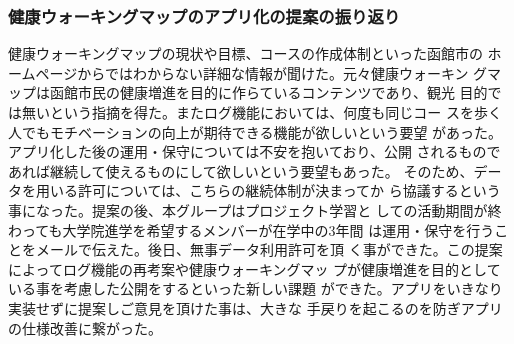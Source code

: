 ﻿\subsubsection{健康ウォーキングマップのアプリ化の提案の振り返り}
健康ウォーキングマップの現状や目標、コースの作成体制といった函館市の
ホームページからではわからない詳細な情報が聞けた。元々健康ウォーキン
グマップは函館市民の健康増進を目的に作らているコンテンツであり、観光
目的では無いという指摘を得た。またログ機能においては、何度も同じコー
スを歩く人でもモチベーションの向上が期待できる機能が欲しいという要望
があった。アプリ化した後の運用・保守については不安を抱いており、公開
されるものであれば継続して使えるものにして欲しいという要望もあった。
そのため、データを用いる許可については、こちらの継続体制が決まってか
ら協議するという事になった。提案の後、本グループはプロジェクト学習と
しての活動期間が終わっても大学院進学を希望するメンバーが在学中の3年間
は運用・保守を行うことをメールで伝えた。後日、無事データ利用許可を頂
く事ができた。この提案によってログ機能の再考案や健康ウォーキングマッ
プが健康増進を目的としている事を考慮した公開をするといった新しい課題
ができた。アプリをいきなり実装せずに提案しご意見を頂けた事は、大きな
手戻りを起こるのを防ぎアプリの仕様改善に繋がった。

